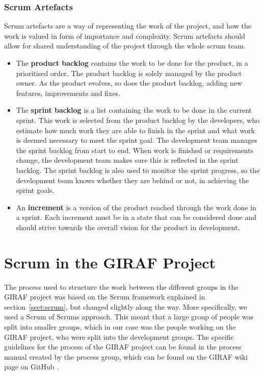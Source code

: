 \subsubsection{Scrum Artefacts}
Scrum artefacts are a way of representing the work of the project, and how the work is valued in form of importance and complexity. Scrum artefacts should allow for shared understanding of the project through the whole scrum team.

\begin{itemize}
\item The \textbf{product backlog} contains the work to be done for the product, in a prioritised order. The product backlog is solely managed by the product owner. As the product evolves, so does the product backlog, adding new features, improvements and fixes.

\item The \textbf{sprint backlog} is a list containing the work to be done in the current sprint. This work is selected from the product backlog by the developers, who estimate how much work they are able to finish in the sprint and what work is deemed necessary to meet the sprint goal.
The development team manages the sprint backlog from start to end. When work is finished or requirements change, the development team makes sure this is reflected in the sprint backlog. 
The sprint backlog is also used to monitor the sprint progress, so the development team knows whether they are behind or not, in achieving the sprint goals. 


\item An \textbf{increment} is a version of the product reached through the work done in a sprint. Each increment must be in a state that can be considered done and should strive towards the overall vision for the product in development. 

\end{itemize}

\section{Scrum in the GIRAF Project}
\label{sect:scrumInGiraf}
The process used to structure the work between the different groups in the GIRAF project was based on the Scrum framework explained in section~\ref{sect:scrum}, but changed slightly along the way. More specifically, we used a Scrum of Scrums approach. This meant that a large group of people was split into smaller groups, which in our case was the people working on the GIRAF project, who were split into the development groups. The specific guidelines for the process of the GIRAF project can be found in the process manual created by the process group, which can be found on the GIRAF wiki page on GitHub \citep{cite:processManualSW602F19}.

